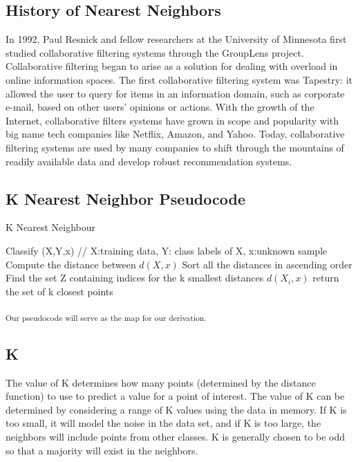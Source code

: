 \documentclass{report}
\begin{document}
\subsection*{History of Nearest Neighbors}

In 1992, Paul Resnick and fellow researchers at the University of Minnesota first studied collaborative filtering systems through the GroupLens project\cite{2}.  Collaborative filtering began to arise as a solution for dealing with overload in online information spaces. The first collaborative filtering system was Tapestry: it allowed the user to query for
items in an information domain, such as corporate e-mail, based on
other users’ opinions or actions\cite{3}. With the growth of the Internet, collaborative filters systems have grown in scope and popularity with big name tech companies like Netflix, Amazon, and Yahoo. Today, collaborative filtering systems are used by many companies to shift through the mountains of readily available data and develop robust recommendation systems.

\subsection*{K Nearest Neighbor Pseudocode }
\begin{algorithm}
  \caption{K Nearest Neighbour}
  \begin{algorithmic}
  	\State Classify (X,Y,x) // X:training data, Y: class labels of X, x:unknown sample
	\State Compute the distance between $d(X, x)$
	\State Sort all the distances in ascending order
	\EndFor
	\State Find the set Z containing indices for the k smallest distances $d(X_{i},x)$
	\State return the set of k closest points 
  \end{algorithmic}
\end{algorithm}
\textsubscript{Our pseudocode will serve as the map for our derivation.}

\subsection*{K}

The value of K determines how many points (determined by the distance function) to use to predict a value for a point of interest.
The value of K can be determined by considering a range of K values using the data in memory.
If K is too small, it will model the noise in the data set, and if K is too large, the neighbors will include points from other classes.
K is generally chosen to be odd so that a majority will exist in the neighbors.
\end{document}
